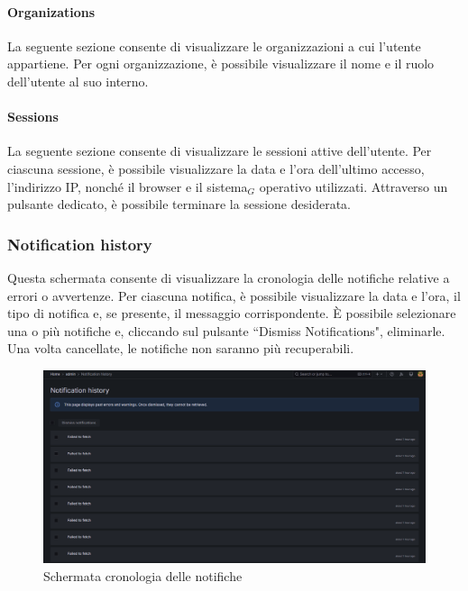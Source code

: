 \documentclass[10pt]{article}
\begin{document}
\begin{justify}
    \paragraph{Organizations}
    La seguente sezione consente di visualizzare le organizzazioni a cui l'utente appartiene. Per ogni organizzazione, è possibile visualizzare il nome e il ruolo dell'utente al suo interno.  
    
    \paragraph{Sessions}
    La seguente sezione consente di visualizzare le sessioni attive dell'utente. Per ciascuna sessione, è possibile visualizzare la data e l'ora dell'ultimo accesso, l'indirizzo IP, nonché il browser e il sistema$_G$ operativo utilizzati. Attraverso un pulsante dedicato, è possibile terminare la sessione desiderata.

    \subsubsection{Notification history}
    Questa schermata consente di visualizzare la cronologia delle notifiche relative a errori o avvertenze. Per ciascuna notifica, è possibile visualizzare la data e l'ora, il tipo di notifica e, se presente, il messaggio corrispondente. È possibile selezionare una o più notifiche e, cliccando sul pulsante ``Dismiss Notifications", eliminarle. Una volta cancellate, le notifiche non saranno più recuperabili.
    \begin{figure}[H]
    \centering
    \includegraphics[width=1\linewidth]{notification.png}
    \caption{Schermata cronologia delle notifiche}
    \end{figure}


\end{justify}
\end{document}
